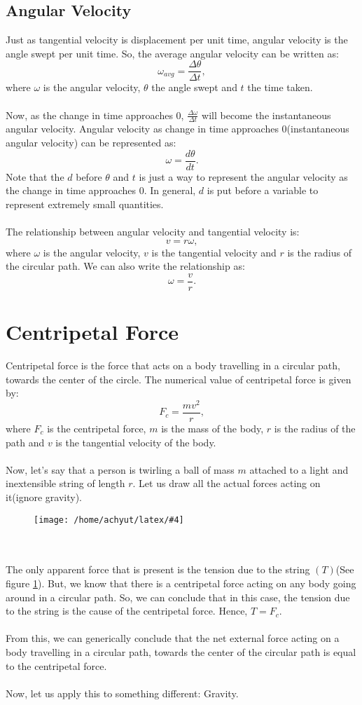 \documentclass[a4paper]{report}
\newcommand{\mkfig}[5]{
  \begin{figure}[#1]
    \centering
    \texttt{[image: /home/achyut/latex/\#4]}
    \caption{\centering{#5}}
    \label{fig.#2}
  \end{figure}
}
\begin{document}
\subsection{Angular Velocity} \label{sec.24}
Just as tangential velocity is displacement per unit time, angular velocity is the angle swept per unit time.
So, the average angular velocity can be written as: $$\omega_{avg}=\frac{\Delta \theta}{\Delta t},$$
where $\omega$ is the angular velocity, $\theta$ the angle swept and $t$ the time taken. \\\\
Now, as the change in time approaches 0, $\frac{\Delta \omega}{\Delta t}$ will become the instantaneous angular
velocity. Angular velocity as change in time approaches 0(instantaneous angular velocity) can be 
represented as: $$\omega=\frac{d\theta}{dt}.$$ Note that the $d$ before $\theta$ and $t$ is just a way to
represent the angular velocity as the change in time approaches 0. In general, $d$ is put before a variable to 
represent extremely small quantities.\\\\
The relationship between angular velocity and tangential velocity is: $$v=r\omega,$$
where $\omega$ is the angular velocity, $v$ is the tangential velocity and $r$ is the radius of the circular path.
We can also write the relationship as: $$\omega=\frac{v}{r}.$$

\section{Centripetal Force}
Centripetal force is the force that acts on a body travelling in a circular path, towards the center of the 
circle. The numerical value of centripetal force is given by: $$F_c=\frac{mv^2}{r},$$
where $F_c$ is the centripetal force, $m$ is the mass of the body, $r$ is the radius of the path and $v$ is the 
tangential velocity of the body.\\\\
Now, let's say that a person is twirling a ball of mass $m$ attached to a light and inextensible string of length
$r$.
Let us draw all the actual forces acting on it(ignore gravity).
\mkfig{h!}{5}{2}{presentation.5.png}{Forces acting on mass} \\\\
The only apparent force that is present is the tension due to the string $(T)$(See figure \ref{fig.5}).
But, we know that there is a centripetal force acting on any body going around in a circular path.
So, we can conclude that in this case, the tension due to the string is the cause of the centripetal force.
Hence, $T=F_c$.\\\\
From this, we can generically conclude that the net external force acting on a body travelling in a circular 
path, towards the center of the circular path is equal to the centripetal force. \\\\
Now, let us apply this to something different: Gravity.
\end{document}
